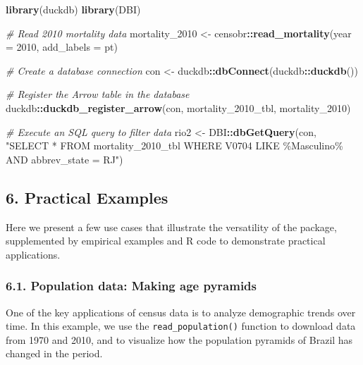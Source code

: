 \documentclass[
]{article}
\newenvironment{Shaded}{\begin{snugshade}}{\end{snugshade}}
\newcommand{\AttributeTok}[1]{\textcolor[rgb]{0.13,0.29,0.53}{#1}}
\newcommand{\CommentTok}[1]{\textcolor[rgb]{0.56,0.35,0.01}{\textit{#1}}}
\newcommand{\DecValTok}[1]{\textcolor[rgb]{0.00,0.00,0.81}{#1}}
\newcommand{\FunctionTok}[1]{\textcolor[rgb]{0.13,0.29,0.53}{\textbf{#1}}}
\newcommand{\NormalTok}[1]{#1}
\newcommand{\OtherTok}[1]{\textcolor[rgb]{0.56,0.35,0.01}{#1}}
\newcommand{\SpecialCharTok}[1]{\textcolor[rgb]{0.81,0.36,0.00}{\textbf{#1}}}
\newcommand{\StringTok}[1]{\textcolor[rgb]{0.31,0.60,0.02}{#1}}
\begin{document}
\begin{Shaded}
\begin{Highlighting}[]
\FunctionTok{library}\NormalTok{(duckdb)}
\FunctionTok{library}\NormalTok{(DBI)}

\CommentTok{\# Read 2010 mortality data}
\NormalTok{mortality\_2010 }\OtherTok{\textless{}{-}}\NormalTok{ censobr}\SpecialCharTok{::}\FunctionTok{read\_mortality}\NormalTok{(}\AttributeTok{year =} \DecValTok{2010}\NormalTok{, }\AttributeTok{add\_labels =} \StringTok{\textquotesingle{}pt\textquotesingle{}}\NormalTok{)}

\CommentTok{\# Create a database connection}
\NormalTok{con }\OtherTok{\textless{}{-}}\NormalTok{ duckdb}\SpecialCharTok{::}\FunctionTok{dbConnect}\NormalTok{(duckdb}\SpecialCharTok{::}\FunctionTok{duckdb}\NormalTok{())}

\CommentTok{\# Register the Arrow table in the database}
\NormalTok{duckdb}\SpecialCharTok{::}\FunctionTok{duckdb\_register\_arrow}\NormalTok{(con, }\StringTok{\textquotesingle{}mortality\_2010\_tbl\textquotesingle{}}\NormalTok{, mortality\_2010)}

\CommentTok{\# Execute an SQL query to filter data}
\NormalTok{rio2 }\OtherTok{\textless{}{-}}\NormalTok{ DBI}\SpecialCharTok{::}\FunctionTok{dbGetQuery}\NormalTok{(con, }\StringTok{"SELECT * FROM \textquotesingle{}mortality\_2010\_tbl\textquotesingle{} WHERE V0704 LIKE \textquotesingle{}\%Masculino\%\textquotesingle{} AND abbrev\_state = \textquotesingle{}RJ\textquotesingle{}"}\NormalTok{)}
\end{Highlighting}
\end{Shaded}

\subsection{6. Practical Examples}\label{practical-examples}

Here we present a few use cases that illustrate the versatility of the
package, supplemented by empirical examples and R code to demonstrate
practical applications.

\subsubsection{6.1. Population data: Making age
pyramids}\label{population-data-making-age-pyramids}

One of the key applications of census data is to analyze demographic
trends over time. In this example, we use the
\texttt{read\_population()} function to download data from 1970 and
2010, and to visualize how the population pyramids of Brazil has changed
in the period.
\end{document}
